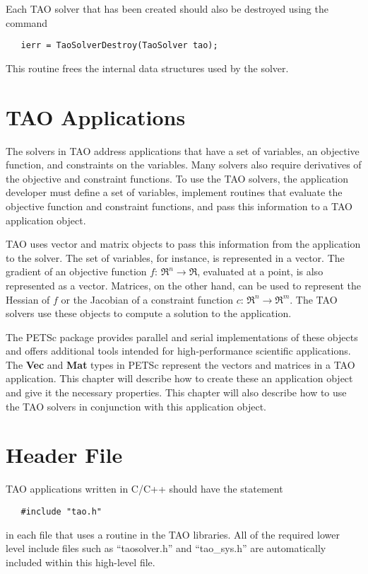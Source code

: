 Each TAO solver that has been created should also be destroyed using
the command 
\begin{verbatim}
   ierr = TaoSolverDestroy(TaoSolver tao);
\end{verbatim}
\noindent 
This routine frees the internal data structures used by the solver.


\section{TAO Applications}
\label{section:taoapplication}
\label{section:petscapp}

The solvers in TAO address applications that have a set of variables, an objective
function, and constraints on the variables.  Many solvers also require derivatives
of the objective and constraint functions.
To use the TAO solvers, the application developer must 
define a set of variables, implement routines that evaluate the 
objective function and constraint functions, and pass this information
to a TAO application object.   

TAO uses vector and matrix objects to pass this information from the
application to the solver.   The set of variables, for instance, is
represented in a vector.
The gradient of an objective function $f: \, \Re^n \to \Re$,
evaluated at a point, is also represented as a vector.
Matrices,  on the other hand,
can be used to represent the Hessian of $f$ or the Jacobian of a constraint
function $c: \, \Re^n \to \Re^m$.  The TAO solvers use
these objects to compute a solution to the application.

The PETSc package provides parallel and serial implementations of these
objects and offers additional tools intended for high-performance 
scientific applications.
The {\bf Vec} and {\bf Mat} types in PETSc
represent the vectors and matrices in a TAO application.
This chapter will describe how to create these an application object
and give it the necessary properties.  This chapter will also describe how to use
the TAO solvers in conjunction with this application object.

\section{Header File}

TAO applications written in C/C++ should have the statement 
\begin{verbatim}
   #include "tao.h"
\end{verbatim}
\noindent
in each file that uses a routine in the TAO libraries.
All of the required lower level include files such as ``taosolver.h''
and ``tao\_sys.h''
are automatically included within this high-level file.


